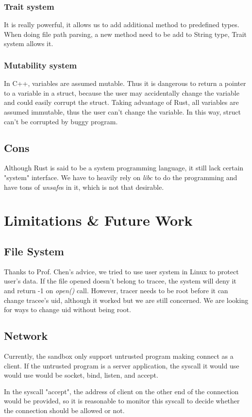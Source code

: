 \documentclass[conference,compsoc]{IEEEtran}
\begin{document}
			\subsubsection{Trait system} 
				It is really powerful, it allows us to add additional method to predefined types. 
				When doing file path parsing, a new method need to be add to String type, Trait system allows it.
			\subsubsection{Mutability system} 
				In C++, variables are assumed mutable. 
				Thus it is dangerous to return a pointer to a variable in a struct, because the user may accidentally change the variable and could easily corrupt the struct.
				Taking advantage of Rust, all variables are assumed immutable, thus the user can't change the variable. 
				In this way, struct can't be corrupted by buggy program.
	\subsection{Cons}
		\par
			Although Rust is said to be a system programming language, it still lack certain "system" interface.
			We have to heavily rely on \emph{libc} to do the programming and have tons of \emph{unsafe}s in it, which is not that desirable. 				

\section{Limitations \& Future Work}
	\subsection{File System}
		\par
			Thanks to Prof. Chen's advice, we tried to use user system in Linux to protect user's data. 
			If the file opened doesn't belong to tracee, the system will deny it and return -1 on \emph{open()} call.
			However, tracer needs to be root before it can change tracee's uid, although it worked but we are still concerned. 
			We are looking for ways to change uid without being root.
	\subsection{Network}
		\par
			Currently, the sandbox only support untrusted program making connect as a client. 
			If the untrusted program is a server application, the syscall it would use would use would be socket, bind, listen, and accept. 
		\par
			In the syscall "accept", the address of client on the other end of the connection would be provided, so it is reasonable to monitor this syscall to decide whether the connection should be allowed or not.
\end{document}
